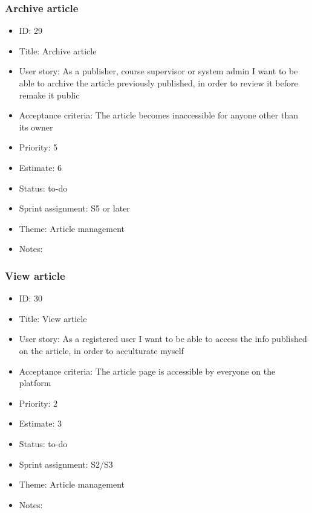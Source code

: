 \subsubsection{Archive article}
\begin{itemize}
	\item ID: 29
	\item Title: Archive article
	\item User story: As a publisher, course supervisor or system admin I want to be able to archive the article previously published, in order to review it before remake it public
	\item Acceptance criteria: The article becomes inaccessible for anyone other than its owner
	\item Priority: 5
	\item Estimate: 6
	\item Status: to-do
	\item Sprint assignment: S5 or later
	\item Theme: Article management
	\item Notes:
\end{itemize}

\subsubsection{View article}
\begin{itemize}
	\item ID: 30
	\item Title: View article
	\item User story: As a registered user I want to be able to access the info published on the article, in order to acculturate myself
	\item Acceptance criteria: The article page is accessible by everyone on the platform
	\item Priority: 2
	\item Estimate: 3
	\item Status: to-do
	\item Sprint assignment: S2/S3
	\item Theme: Article management
	\item Notes:
\end{itemize}

